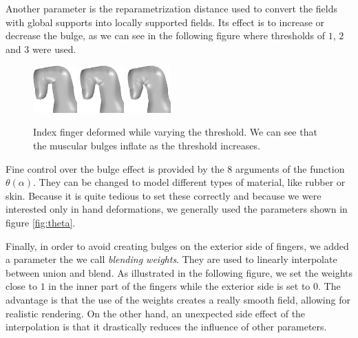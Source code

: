 \documentclass[a4paper,10pt]{article}
\begin{document}
\begin{multicols}{2}
Another parameter is the reparametrization distance used to convert the fields with global supports into locally supported fields.
Its effect is to increase or decrease the bulge, as we can see in the following figure where thresholds of $1$, $2$ and $3$ were used.

\begin{figure}[H]
\centering
\includegraphics[width=0.15\textwidth]{figs/index_implicit_thresh1}
\includegraphics[width=0.15\textwidth]{figs/index_implicit_thresh2}
\includegraphics[width=0.15\textwidth]{figs/index_implicit_thresh3}
\caption{Index finger deformed while varying the threshold.
We can see that the muscular bulges inflate as the threshold increases.}
\end{figure}

Fine control over the bulge effect is provided by the 8 arguments of the function $\theta(\alpha)$.
They can be changed to model different types of material, like rubber or skin.
Because it is quite tedious to set these correctly and because we were interested only in hand deformations, we generally used the parameters shown in figure \ref{fig:theta}.

Finally, in order to avoid creating bulges on the exterior side of fingers, we added a parameter the we call \emph{blending weights}.
They are used to linearly interpolate between union and blend.
As illustrated in the following figure, we set the weights close to $1$ in the inner part of the fingers while the exterior side is set to $0$.
The advantage is that the use of the weights creates a really smooth field, allowing for realistic rendering.
On the other hand, an unexpected side effect of the interpolation is that it drastically reduces the influence of other parameters.


\end{multicols}
\end{document}
